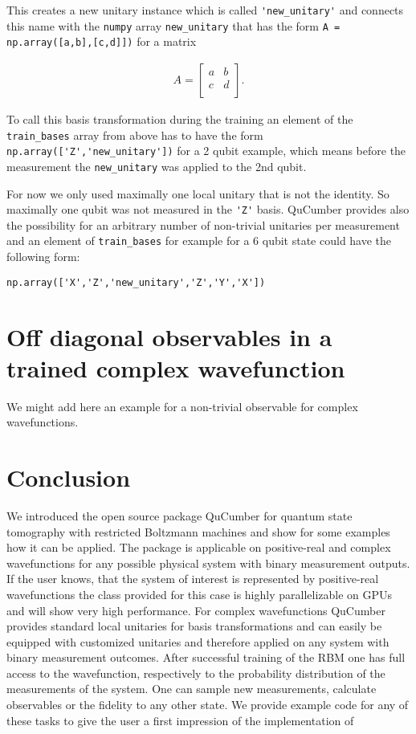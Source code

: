 \documentclass[submission, Phys]{SciPost}
\begin{document}
This creates a new unitary instance which is called \verb|'new_unitary'| and connects this name with the \verb|numpy| array 
\verb|new_unitary| that has the form \verb|A = np.array([a,b],[c,d]])| for a matrix 

\begin{align}
A = 
\begin{bmatrix}
a &b \\
c &d \\ 
\end{bmatrix}.
\end{align} 

To call this basis transformation during the training an element of the \verb|train_bases| array from above has to have the form 
\verb|np.array(['Z','new_unitary'])| for a 2 qubit example, which means before the measurement the \verb|new_unitary| was applied to the 2nd qubit.

For now we only used maximally one local unitary that is not the identity. So maximally one qubit was not measured in the \verb|'Z'| basis. QuCumber provides also the possibility for an arbitrary number of non-trivial unitaries per measurement and an element of  \verb|train_bases| for example for a 6 qubit state could have the following form:

\verb|np.array(['X','Z','new_unitary','Z','Y','X'])|

\section{Off diagonal observables in a trained complex wavefunction}

We might add here an example for a non-trivial observable for complex wavefunctions.

\section{Conclusion}

We introduced the open source package QuCumber for quantum state tomography with restricted Boltzmann machines and show for some examples how it can be applied. The package is applicable on positive-real and complex wavefunctions for any
possible physical system with binary measurement outputs. If the user knows, that the system of interest is represented by positive-real wavefunctions the class provided for this case is highly parallelizable on GPUs and will show very high performance. For complex wavefunctions QuCumber provides standard local unitaries for basis transformations and can easily be equipped with customized unitaries and therefore applied on any system with binary measurement outcomes.
After successful training of the RBM one has full access to the wavefunction, respectively to the probability distribution of the measurements of the system. One can sample new measurements, calculate observables or the fidelity to any other state. We provide example code for any of these tasks to give the user a first impression of the implementation of 
\end{document}
